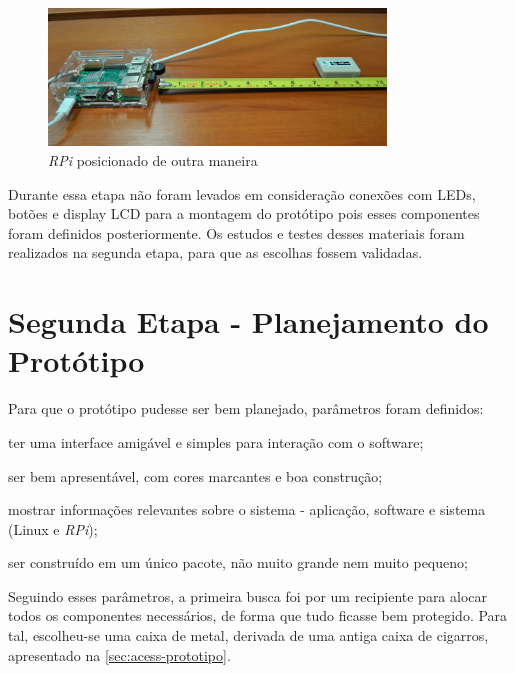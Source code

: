 \documentclass[
		12pt,				%
		openright,			%
		oneside,			%
		a4paper,			%
		chapter=TITLE,		%
		english,			%
		brazil				%
	]{abntex2}
\begin{document}
\begin{figure}[htb]
	\caption{\label{fig:posiciona-rpi}\textit{RPi} posicionado de outra maneira}
	\begin{center}
		\includegraphics[width=0.8\textwidth]{img/ambiente2.jpg}
	\end{center}
\end{figure}

Durante essa etapa não foram levados em consideração conexões com LEDs, botões e display LCD para a montagem do protótipo pois esses componentes foram definidos posteriormente. Os estudos e testes desses materiais foram realizados na segunda etapa, para que as escolhas fossem validadas.

\section{Segunda Etapa - Planejamento do Protótipo}\label{sec:segunda-etapa}

Para que o protótipo pudesse ser bem planejado, parâmetros foram definidos:

\begin{alineas}
	\item ter uma interface amigável e simples para interação com o software;
	\item ser bem apresentável, com cores marcantes e boa construção;
	\item mostrar informações relevantes sobre o sistema - aplicação, software e sistema (Linux e \textit{RPi});
	\item ser construído em um único pacote, não muito grande nem muito pequeno;
\end{alineas}

Seguindo esses parâmetros, a primeira busca foi por um recipiente para alocar todos os componentes necessários, de forma que tudo ficasse bem protegido. Para tal, escolheu-se uma caixa de metal, derivada de uma antiga caixa de cigarros, apresentado na \autoref{sec:acess-prototipo}.
\end{document}
